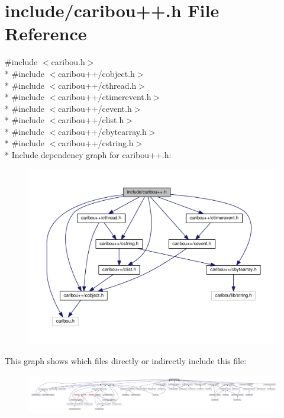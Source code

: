 \section{include/caribou++.h File Reference}
\label{caribou_09_09_8h}
{\ttfamily \#include $<$caribou.\+h$>$}\\*
{\ttfamily \#include $<$caribou++/cobject.\+h$>$}\\*
{\ttfamily \#include $<$caribou++/cthread.\+h$>$}\\*
{\ttfamily \#include $<$caribou++/ctimerevent.\+h$>$}\\*
{\ttfamily \#include $<$caribou++/cevent.\+h$>$}\\*
{\ttfamily \#include $<$caribou++/clist.\+h$>$}\\*
{\ttfamily \#include $<$caribou++/cbytearray.\+h$>$}\\*
{\ttfamily \#include $<$caribou++/cstring.\+h$>$}\\*
Include dependency graph for caribou++.h\+:
\nopagebreak
\begin{figure}[H]
\begin{center}
\leavevmode
\includegraphics[width=350pt]{caribou_09_09_8h__incl}
\end{center}
\end{figure}
This graph shows which files directly or indirectly include this file\+:
\nopagebreak
\begin{figure}[H]
\begin{center}
\leavevmode
\includegraphics[width=350pt]{caribou_09_09_8h__dep__incl}
\end{center}
\end{figure}
